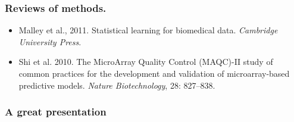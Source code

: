 \begin{frame}
\frametitle{Reviews of methods.}
\begin{itemize}
  
  \item Malley et al., 2011. Statistical learning for biomedical
    data. \textit{Cambridge University Press}.
    
\item Shi et al. 2010. The MicroArray Quality Control (MAQC)-II study of
  common practices for the development and validation of microarray-based
  predictive models. \textit{Nature Biotechnology}, 28: 827--838.

  

  
  
  
\end{itemize}
\end{frame}




\begin{frame}
\frametitle{A great presentation}

\end{frame}








